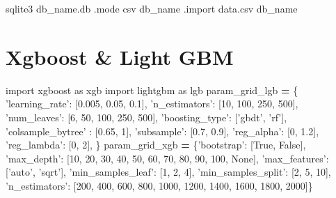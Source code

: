 \documentclass[]{book}
\newenvironment{Shaded}{\begin{snugshade}}{\end{snugshade}}
\newcommand{\DecValTok}[1]{\textcolor[rgb]{0.00,0.00,0.81}{#1}}
\newcommand{\FloatTok}[1]{\textcolor[rgb]{0.00,0.00,0.81}{#1}}
\newcommand{\StringTok}[1]{\textcolor[rgb]{0.31,0.60,0.02}{#1}}
\newcommand{\ImportTok}[1]{#1}
\newcommand{\VariableTok}[1]{\textcolor[rgb]{0.00,0.00,0.00}{#1}}
\newcommand{\OperatorTok}[1]{\textcolor[rgb]{0.81,0.36,0.00}{\textbf{#1}}}
\newcommand{\ExtensionTok}[1]{#1}
\newcommand{\NormalTok}[1]{#1}
\begin{document}
\begin{Shaded}
\begin{Highlighting}[]
\ExtensionTok{sqlite3}\NormalTok{ db_name.db}
\ExtensionTok{.mode}\NormalTok{ csv db_name}
\ExtensionTok{.import}\NormalTok{ data.csv db_name}
\end{Highlighting}
\end{Shaded}

\section{Xgboost \& Light GBM}\label{xgboost-light-gbm}

\begin{Shaded}
\begin{Highlighting}[]
\ImportTok{import}\NormalTok{ xgboost }\ImportTok{as}\NormalTok{ xgb}
\ImportTok{import}\NormalTok{ lightgbm }\ImportTok{as}\NormalTok{ lgb}
\NormalTok{param_grid_lgb }\OperatorTok{=}\NormalTok{ \{}
    \StringTok{'learning_rate'}\NormalTok{: [}\FloatTok{0.005}\NormalTok{, }\FloatTok{0.05}\NormalTok{, }\FloatTok{0.1}\NormalTok{], }\StringTok{'n_estimators'}\NormalTok{: [}\DecValTok{10}\NormalTok{, }\DecValTok{100}\NormalTok{, }\DecValTok{250}\NormalTok{, }\DecValTok{500}\NormalTok{],}
    \StringTok{'num_leaves'}\NormalTok{: [}\DecValTok{6}\NormalTok{, }\DecValTok{50}\NormalTok{, }\DecValTok{100}\NormalTok{, }\DecValTok{250}\NormalTok{, }\DecValTok{500}\NormalTok{], }\StringTok{'boosting_type'}\NormalTok{: [}\StringTok{'gbdt'}\NormalTok{, }\StringTok{'rf'}\NormalTok{],}
    \StringTok{'colsample_bytree'}\NormalTok{ : [}\FloatTok{0.65}\NormalTok{, }\DecValTok{1}\NormalTok{], }\StringTok{'subsample'}\NormalTok{: [}\FloatTok{0.7}\NormalTok{, }\FloatTok{0.9}\NormalTok{],}
    \StringTok{'reg_alpha'}\NormalTok{: [}\DecValTok{0}\NormalTok{, }\FloatTok{1.2}\NormalTok{], }\StringTok{'reg_lambda'}\NormalTok{: [}\DecValTok{0}\NormalTok{, }\DecValTok{2}\NormalTok{],}
\NormalTok{    \}}
\NormalTok{param_grid_xgb }\OperatorTok{=}\NormalTok{ \{}\StringTok{'bootstrap'}\NormalTok{: [}\VariableTok{True}\NormalTok{, }\VariableTok{False}\NormalTok{],}
 \StringTok{'max_depth'}\NormalTok{: [}\DecValTok{10}\NormalTok{, }\DecValTok{20}\NormalTok{, }\DecValTok{30}\NormalTok{, }\DecValTok{40}\NormalTok{, }\DecValTok{50}\NormalTok{, }\DecValTok{60}\NormalTok{, }\DecValTok{70}\NormalTok{, }\DecValTok{80}\NormalTok{, }\DecValTok{90}\NormalTok{, }\DecValTok{100}\NormalTok{, }\VariableTok{None}\NormalTok{],}
 \StringTok{'max_features'}\NormalTok{: [}\StringTok{'auto'}\NormalTok{, }\StringTok{'sqrt'}\NormalTok{],}
 \StringTok{'min_samples_leaf'}\NormalTok{: [}\DecValTok{1}\NormalTok{, }\DecValTok{2}\NormalTok{, }\DecValTok{4}\NormalTok{],}
 \StringTok{'min_samples_split'}\NormalTok{: [}\DecValTok{2}\NormalTok{, }\DecValTok{5}\NormalTok{, }\DecValTok{10}\NormalTok{],}
 \StringTok{'n_estimators'}\NormalTok{: [}\DecValTok{200}\NormalTok{, }\DecValTok{400}\NormalTok{, }\DecValTok{600}\NormalTok{, }\DecValTok{800}\NormalTok{, }\DecValTok{1000}\NormalTok{, }\DecValTok{1200}\NormalTok{, }\DecValTok{1400}\NormalTok{, }\DecValTok{1600}\NormalTok{, }\DecValTok{1800}\NormalTok{, }\DecValTok{2000}\NormalTok{]\}}
\end{Highlighting}
\end{Shaded}
\end{document}
